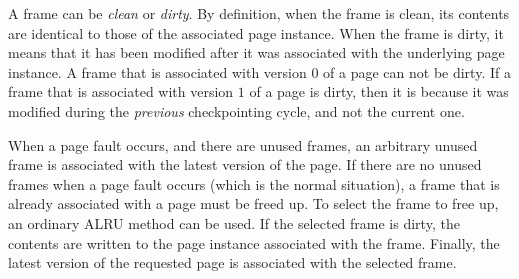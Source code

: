 A frame can be \emph{clean} or \emph{dirty}.  By definition, when the
frame is clean, its contents are identical to those of the associated
page instance.  When the frame is dirty, it means that it has been
modified after it was associated with the underlying page instance.  A
frame that is associated with version $0$ of a page can not be dirty.
If a frame that is associated with version $1$ of a page is dirty,
then it is because it was modified during the \emph{previous}
checkpointing cycle, and not the current one.

When a page fault occurs, and there are unused frames, an arbitrary
unused frame is associated with the latest version of the page.  If
there are no unused frames when a page fault occurs (which is the
normal situation), a frame that is already associated with a page must
be freed up.  To select the frame to free up, an ordinary ALRU method
can be used.  If the selected frame is dirty, the contents are written
to the page instance associated with the frame.  Finally, the latest
version of the requested page is associated with the selected frame.

